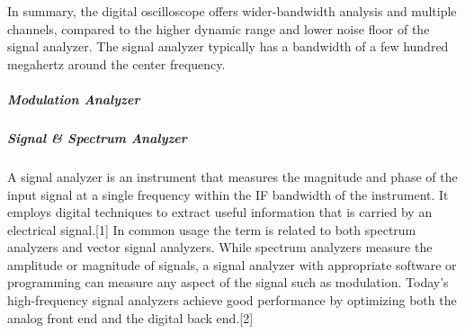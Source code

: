 



	In summary, the digital oscilloscope offers wider-bandwidth analysis and multiple channels, compared to the higher dynamic range and lower noise floor of the signal analyzer. The signal analyzer typically has a bandwidth of a few hundred megahertz around the center frequency.


\subparagraph*{Modulation Analyzer}

\subparagraph*{Signal \& Spectrum Analyzer}

	A signal analyzer is an instrument that measures the magnitude and phase of the input signal at a single frequency within the IF bandwidth of the instrument. It employs digital techniques to extract useful information that is carried by an electrical signal.[1] In common usage the term is related to both spectrum analyzers and vector signal analyzers. While spectrum analyzers measure the amplitude or magnitude of signals, a signal analyzer with appropriate software or programming can measure any aspect of the signal such as modulation. Today’s high-frequency signal analyzers achieve good performance by optimizing both the analog front end and the digital back end.[2]

